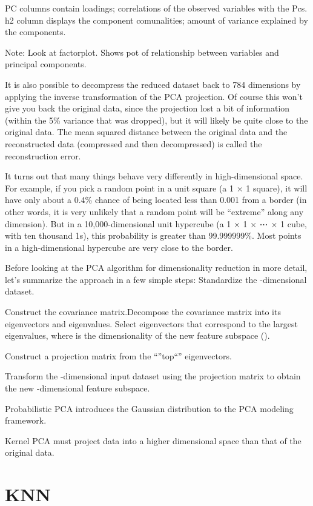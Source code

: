\documentclass[]{book}
\begin{document}
PC columns contain loadings; correlations of the observed variables with
the Pcs. h2 column displays the component comunalities; amount of
variance explained by the components.

Note: Look at factorplot. Shows pot of relationship between variables
and principal components.

It is also possible to decompress the reduced dataset back to 784
dimensions by applying the inverse transformation of the PCA projection.
Of course this won't give you back the original data, since the
projection lost a bit of information (within the 5\% variance that was
dropped), but it will likely be quite close to the original data. The
mean squared distance between the original data and the reconstructed
data (compressed and then decompressed) is called the reconstruction
error.

It turns out that many things behave very differently in
high-dimensional space. For example, if you pick a random point in a
unit square (a 1 × 1 square), it will have only about a 0.4\% chance of
being located less than 0.001 from a border (in other words, it is very
unlikely that a random point will be ``extreme'' along any dimension).
But in a 10,000-dimensional unit hypercube (a 1 × 1 × ⋯ × 1 cube, with
ten thousand 1s), this probability is greater than 99.999999\%. Most
points in a high-dimensional hypercube are very close to the border.

Before looking at the PCA algorithm for dimensionality reduction in more
detail, let's summarize the approach in a few simple steps: Standardize
the -dimensional dataset.

Construct the covariance matrix.Decompose the covariance matrix into its
eigenvectors and eigenvalues. Select eigenvectors that correspond to the
largest eigenvalues, where is the dimensionality of the new feature
subspace ().

Construct a projection matrix from the ``''top``'' eigenvectors.

Transform the -dimensional input dataset using the projection matrix to
obtain the new -dimensional feature subspace.

Probabilistic PCA introduces the Gaussian distribution to the PCA
modeling framework.

Kernel PCA must project data into a higher dimensional space than that
of the original data.

\section{KNN}\label{knn}
\end{document}
